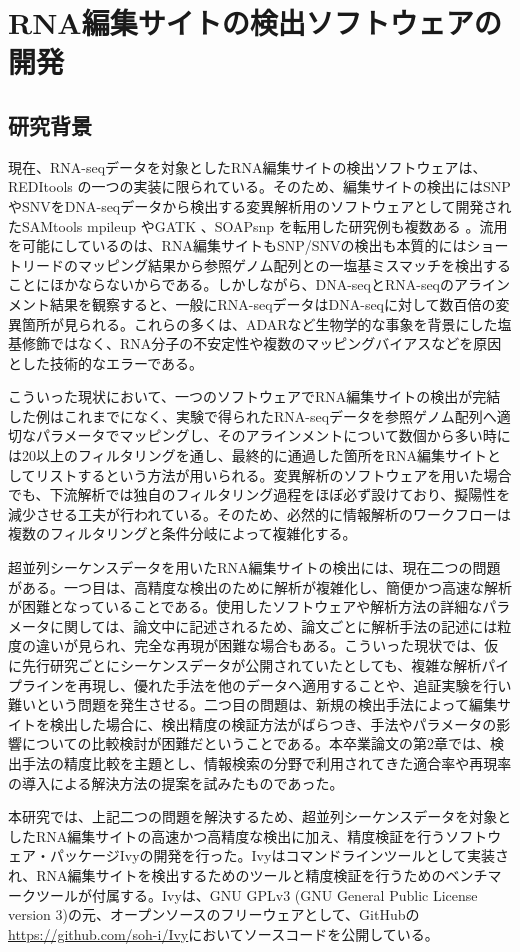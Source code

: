 \chapter{RNA編集サイトの検出ソフトウェアの開発}
\section{研究背景}
現在、RNA-seqデータを対象としたRNA編集サイトの検出ソフトウェアは、REDItools \citep{Picardi:2013aa}の一つの実装に限られている。そのため、編集サイトの検出にはSNPやSNVをDNA-seqデータから検出する変異解析用のソフトウェアとして開発されたSAMtools mpileup \citep{Li:2009aa}やGATK \citep{McKenna:2010aa}、SOAPsnp \citep{Yu:2013aa}を転用した研究例も複数ある \citep{Danecek:2012aa, Chen:2012aa, Sanjana:2012aa, Peng:2012aa}。流用を可能にしているのは、RNA編集サイトもSNP/SNVの検出も本質的にはショートリードのマッピング結果から参照ゲノム配列との一塩基ミスマッチを検出することにほかならないからである。しかしながら、DNA-seqとRNA-seqのアラインメント結果を観察すると、一般にRNA-seqデータはDNA-seqに対して数百倍の変異箇所が見られる。これらの多くは、ADARなど生物学的な事象を背景にした塩基修飾ではなく、RNA分子の不安定性や複数のマッピングバイアスなどを原因とした技術的なエラーである。
\par
こういった現状において、一つのソフトウェアでRNA編集サイトの検出が完結した例はこれまでになく、実験で得られたRNA-seqデータを参照ゲノム配列へ適切なパラメータでマッピングし、そのアラインメントについて数個から多い時には20以上のフィルタリングを通し、最終的に通過した箇所をRNA編集サイトとしてリストするという方法が用いられる。変異解析のソフトウェアを用いた場合でも、下流解析では独自のフィルタリング過程をほぼ必ず設けており、擬陽性を減少させる工夫が行われている。そのため、必然的に情報解析のワークフローは複数のフィルタリングと条件分岐によって複雑化する。
\par
超並列シーケンスデータを用いたRNA編集サイトの検出には、現在二つの問題がある。一つ目は、高精度な検出のために解析が複雑化し、簡便かつ高速な解析が困難となっていることである。使用したソフトウェアや解析方法の詳細なパラメータに関しては、論文中に記述されるため、論文ごとに解析手法の記述には粒度の違いが見られ、完全な再現が困難な場合もある。こういった現状では、仮に先行研究ごとにシーケンスデータが公開されていたとしても、複雑な解析パイプラインを再現し、優れた手法を他のデータへ適用することや、追証実験を行い難いという問題を発生させる。二つ目の問題は、新規の検出手法によって編集サイトを検出した場合に、検出精度の検証方法がばらつき、手法やパラメータの影響についての比較検討が困難だということである。本卒業論文の第2章では、検出手法の精度比較を主題とし、情報検索の分野で利用されてきた適合率や再現率の導入による解決方法の提案を試みたものであった。
\par
本研究では、上記二つの問題を解決するため、超並列シーケンスデータを対象としたRNA編集サイトの高速かつ高精度な検出に加え、精度検証を行うソフトウェア・パッケージIvyの開発を行った。Ivyはコマンドラインツールとして実装され、RNA編集サイトを検出するためのツールと精度検証を行うためのベンチマークツールが付属する。Ivyは、GNU GPLv3 (GNU General Public License version 3)の元、オープンソースのフリーウェアとして、GitHubの\url{https://github.com/soh-i/Ivy}においてソースコードを公開している。

